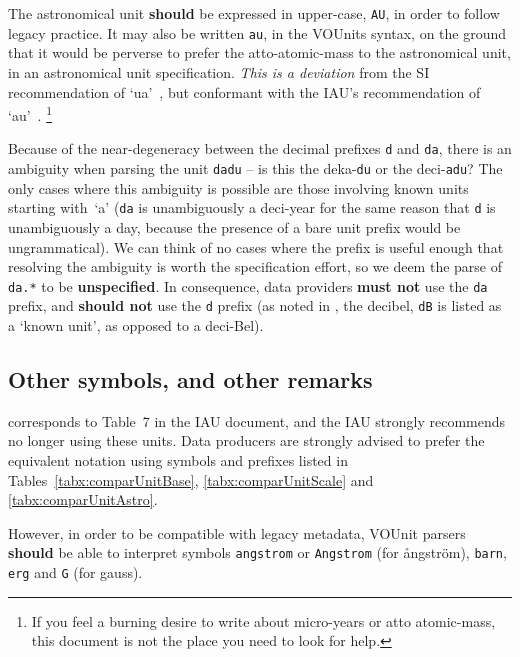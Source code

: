 \documentclass[11pt,a4paper]{ivoa}
\newcommand{\unit}[1]{\texttt{\small\color{orange}#1}}
\newcommand*\norm[1]{\textbf{\color{ivoacolor}#1}}
\begin{document}
The astronomical unit \norm{should} be expressed in upper-case, \unit{AU}, in
order to follow legacy practice.  It may also be written \unit{au}, in
the VOUnits syntax, on the ground that it would be perverse to prefer
the atto-atomic-mass to the astronomical unit, in an astronomical unit
specification.
\emph{This is a deviation} from the SI recommendation of
`ua'~\citep[Table 7]{si-brochure}, but conformant with the IAU's
recommendation of `au'~\citep{iau12}.%
\footnote{If you feel a burning desire to write about micro-years or
atto atomic-mass, this document is not the place you need to look
for help.}

Because of the near-degeneracy between the decimal prefixes \texttt{d}
and \texttt{da}, there is an ambiguity when parsing the
unit \unit{dadu} -- is this the deka-\unit{du} or the deci-\unit{adu}?
The only cases where this ambiguity is possible are those involving
known units starting with~`a' (\texttt{da} is unambiguously a
deci-year for the same reason that \texttt{d} is unambiguously a day,
because the presence of a bare unit prefix would be ungrammatical).
We can think of no cases where the prefix is useful enough that
resolving the ambiguity is worth the specification effort, so we deem
the parse of \texttt{da.*} to be \textbf{unspecified}. %
In consequence, data providers \norm{must not} use the \texttt{da}
prefix, and \norm{should not} use the \texttt d prefix (as noted
in , the decibel, \unit{dB} is listed as a `known
unit', as opposed to a deci-Bel).

\subsection{Other symbols, and other remarks}
\label{sec:other}

 corresponds to Table~7 in the IAU document, and the IAU strongly
recommends no longer using these units. 
Data producers are strongly advised to prefer the equivalent notation using symbols and prefixes listed in 
Tables~\ref{tabx:comparUnitBase}, \ref{tabx:comparUnitScale} and \ref{tabx:comparUnitAstro}. 

However, in order to be compatible with legacy metadata, VOUnit
parsers \norm{should} be able to interpret symbols \unit{angstrom}
or \unit{Angstrom} (for \aa{}ngstr\"om), \unit{barn}, \unit{erg}
and \unit{G} (for gauss).
\end{document}
